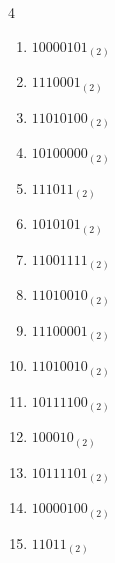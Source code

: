 \begin{multicols}{4}
\begin{enumerate}
        \phantom{$=253$}

  \item $10000101_{(2)}$

        \phantom{$=133$}

\columnbreak %

  \item $1110001_{(2)}$

        \phantom{$=113$}

  \item $11010100_{(2)}$

        \phantom{$=212$}

  \item $10100000_{(2)}$

        \phantom{$=160$}

  \item $111011_{(2)}$

        \phantom{$=59$}

  \item $1010101_{(2)}$

        \phantom{$=85$}

  \item $11001111_{(2)}$

        \phantom{$=207$}

  \item $11010010_{(2)}$

        \phantom{$=210$}

  \item $11100001_{(2)}$

        \phantom{$=225$}

  \item $11010010_{(2)}$

        \phantom{$=210$}

  \item $10111100_{(2)}$

        \phantom{$=188$}

  \item $100010_{(2)}$

        \phantom{$=34$}

  \item $10111101_{(2)}$

        \phantom{$=189$}

  \item $10000100_{(2)}$

        \phantom{$=132$}

  \item $11011_{(2)}$


\end{enumerate}
\end{multicols}
